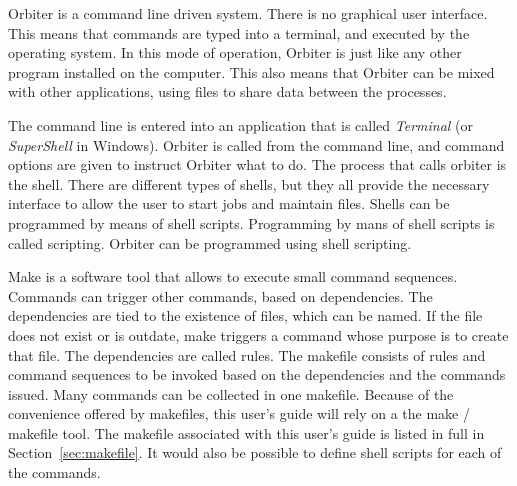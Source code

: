 
Orbiter is a command line driven system.
There is no graphical user interface.
This means that commands are typed into a terminal, and executed by the operating system.
In this mode of operation, Orbiter is just like any other program installed on the computer. 
This also means that Orbiter 
can be mixed with other applications, using files to share data between the processes. 

\bigskip


The command line is entered into an application that is called {\em Terminal} (or {\em SuperShell} in Windows).
Orbiter is called from the command line, and command options are given to instruct Orbiter what to do.
The process that calls orbiter is the shell. There are different types of shells, but they all 
provide the necessary interface to allow the user to start jobs and maintain files. 
Shells can be programmed by means of shell scripts. Programming by mans of shell scripts is called scripting. 
Orbiter can be programmed using shell scripting. 


\bigskip


Make is a software tool that allows to execute small command sequences. 
Commands can trigger other commands, based on dependencies. The dependencies are tied to the existence of files, 
which can be named. If the file does not exist or is outdate, make triggers a command whose purpose is to create that file.
The dependencies are called rules. 
The makefile consists of rules and command sequences to be invoked based on the dependencies 
and the commands issued.
Many commands can be collected in one makefile. 
Because of the convenience offered by makefiles, 
this user's guide 
will rely on a the make / makefile tool.
The makefile associated with this user's guide is listed in full in Section~\ref{sec:makefile}.
It would also be possible to define shell scripts for each of the commands.


\bigskip

